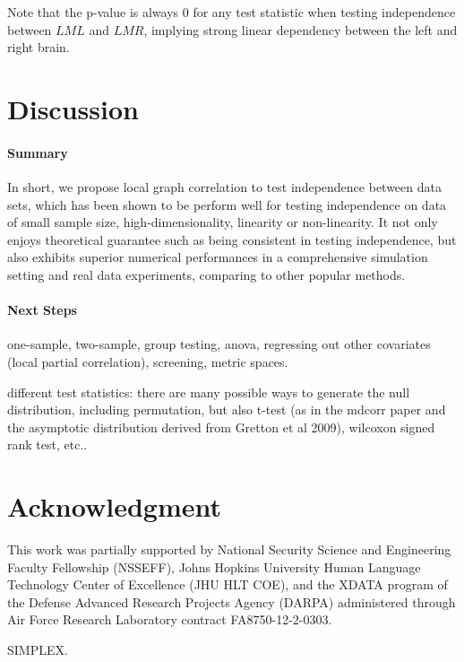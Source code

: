 \documentclass[11pt]{article}
\begin{document}
Note that the p-value is always $0$ for any test statistic when testing independence between $LML$ and $LMR$, implying strong linear dependency between the left and right brain.

\section{Discussion}
\label{conclu}

\paragraph{Summary}

In short, we propose local graph correlation to test independence between data sets, which has been shown to be perform well for testing independence on data of small sample size, high-dimensionality, linearity or non-linearity. It not only enjoys theoretical guarantee such as being consistent in testing independence, but also exhibits superior numerical performances in a comprehensive simulation setting and real data experiments, comparing to other popular methods.


\paragraph{Next Steps}

one-sample, two-sample, group testing, anova, regressing out other covariates (local partial correlation), screening, metric spaces.

different test statistics: there are many possible ways to generate the null distribution, including permutation, but also t-test (as in the mdcorr paper and the asymptotic distribution derived from Gretton et al 2009), wilcoxon signed rank test, etc..


\section*{Acknowledgment}
This work was partially supported by National Security Science and Engineering Faculty Fellowship (NSSEFF), Johns Hopkins University Human Language Technology Center of Excellence (JHU HLT COE), and the XDATA program of the Defense Advanced Research Projects Agency (DARPA) administered through Air Force Research Laboratory contract FA8750-12-2-0303.

SIMPLEX.
\end{document}

